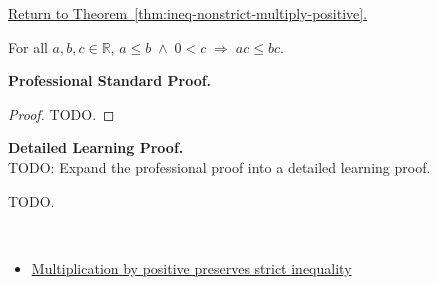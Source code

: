 \newpage
{}
\label{prf:ineq-nonstrict-multiply-positive}

\begin{remark*}[Return]
\hyperref[thm:ineq-nonstrict-multiply-positive]{Return to Theorem~\ref*{thm:ineq-nonstrict-multiply-positive}.}
\end{remark*}

\begin{theorem*}
For all $a, b, c \in \mathbb{R}$,
$a \le b \;\land\; 0 < c \;\Rightarrow\; ac \le bc$.
\end{theorem*}

\textbf{Professional Standard Proof.}~\\
\begin{proof}
TODO.
\end{proof}

\textbf{Detailed Learning Proof.}~\\
TODO: Expand the professional proof into a detailed learning proof.


\begin{remark*}
TODO.
\end{remark*}

\begin{remark*}[Dependencies]~\\
\begin{itemize}
  \item \hyperref[thm:ineq-multiply-positive]{Multiplication by positive preserves strict inequality}
\end{itemize}
\end{remark*}
